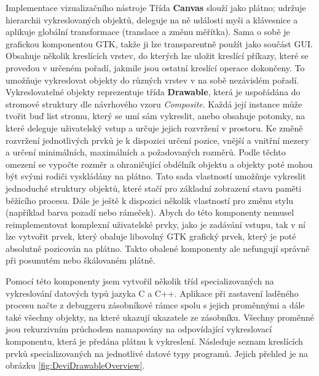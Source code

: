 \documentclass[bc,male,python,dept460]{diploma}						%
\newcommand{\parspace}[1][]{
	\ifthenelse{\isempty{#1}}{\vspace{5mm}}{\vspace{#1}}
	\par
}
\begin{document}
\begin{section}{Implementace vizualizačního nástroje}
	Třída \textbf{Canvas} slouží jako plátno; udržuje hierarchii vykreslovaných objektů, deleguje na ně události myši a klávesnice a aplikuje globální transformace
	(translace a změnu měřítka). Sama o sobě je grafickou komponentou GTK, takže ji lze transparentně použít jako součást GUI.
	Obsahuje několik kreslících vrstev, do kterých lze uložit kreslící příkazy, které se provedou v určeném pořadí, jakmile jsou ostatní kreslící operace dokončeny.
	To umožňuje vykreslovat objekty do různých vrstev v na sobě nezávislém pořadí.
	Vykreslovatelné objekty reprezentuje třída \textbf{Drawable}, která je uspořádána do stromové struktury dle návrhového vzoru
	\textit{Composite}\cite[183]{gof}. Každá její instance může tvořit buď list stromu, který se umí sám vykreslit, anebo obsahuje potomky, na které deleguje
	uživatelský vstup a určuje jejich rozvržení v prostoru. Ke změně rozvržení jednotlivých prvků je k dispozici určení pozice, vnější a vnitřní mezery
	a určení minimálních, maximálních a požadovaných rozměrů. Podle těchto omezení se vypočte rozměr a ohraničující obdélník objektu a objekty poté mohou být
	svými rodiči vyskládány na plátno.
	Tato sada vlastností umožňuje vykreslit jednoduché struktury objektů, které stačí pro základní zobrazení stavu paměti běžícího procesu.
	Dále je ještě k dispozici několik vlastností pro změnu stylu (například barva pozadí nebo rámeček). Abych do této komponenty
	nemusel reimplementovat komplexní uživatelské prvky, jako je zadávání vstupu, tak v ní lze vytvořit prvek, který obaluje libovolný GTK grafický prvek,
	který je poté absolutně pozicován na plátno.
	Takto obalené komponenty ale nefungují správně při posunutém nebo škálovaném plátně. %
	
	\parspace Pomocí této komponenty jsem vytvořil několik tříd specializovaných na vykreslování datových typů jazyka C a C++. Aplikace při zastavení laděného
	procesu načte z debuggeru zásobníkové rámce spolu s jejich proměnnými a dále také všechny objekty, na které ukazují ukazatele ze zásobníku.
	Všechny proměnné jsou rekurzivním průchodem namapovány na odpovídající vykreslovací komponentu, která je předána plátnu k vykreslení.
	Následuje seznam kreslících prvků specializovaných na jednotlivé datové typy programů. Jejich přehled je na obrázku \ref{fig:DeviDrawableOverview}.
	

\end{section}
\end{document}
